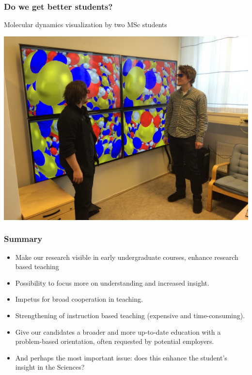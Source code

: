 \documentclass{beamer}
\begin{document}
\begin{frame}
\frametitle{Do we get better students?}

\begin{block}{Molecular dynamics visualization by two MSc students }


\centerline{\includegraphics[width=0.7\linewidth]{figures/visualize.jpg}}




\end{block}
\end{frame}

\begin{frame}
\frametitle{Summary}

\begin{block}{}

\begin{itemize}
\item Make our research visible in early undergraduate courses, enhance research based teaching

\item Possibility to focus more on understanding and increased insight.

\item Impetus for broad cooperation in teaching.

\item Strengthening of instruction based teaching (expensive and time-consuming).

\item Give our candidates a broader and more up-to-date education with a problem-based orientation, often requested by potential employers.

\item And perhaps the most important issue: does this enhance the student's insight in the Sciences?
\end{itemize}

\noindent
\end{block}
\end{frame}
\end{document}
